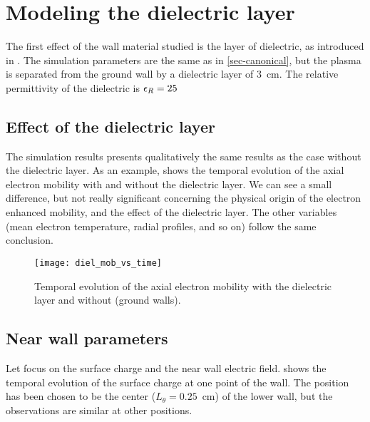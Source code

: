 
\section{Modeling the dielectric layer }
  \label{sec-diel_layer}
  
  The first effect of the wall material studied is the layer of dielectric, as introduced in .
  The simulation parameters are the same as in \cref{sec-canonical}, but the plasma is separated from the ground wall by a dielectric layer of 3~cm.
  The relative permittivity of the dielectric is $\epsilon_{R}=25$
  
  
  \subsection{Effect of the dielectric layer} \label{subsec-effect_mob}
  
  The simulation results presents qualitatively the same results as the case without the dielectric layer.
  As an example,  shows the temporal evolution of the axial electron mobility with and without the dielectric layer.
  We can see a small difference, but not really significant concerning the physical origin of the electron enhanced mobility, and the effect of the dielectric layer.
  The other variables (mean electron temperature, radial profiles, and so on) follow the same conclusion.
  
  \begin{figure}[hbtp]
    \centering
    \texttt{[image: diel\_mob\_vs\_time]}
    \caption{Temporal evolution of the axial electron mobility with the dielectric layer and without (ground walls).}
    \label{fig-mod_diel_comp}
  \end{figure}
  
  \subsection{Near wall parameters} \label{subsec-nearwall}
    Let focus on the surface charge and the near wall electric field.
     shows the temporal evolution of the surface charge at one point of the wall.
    The position has been chosen to be the center ($L_{\theta} = 0.25$~cm) of the lower wall, but the observations are similar at other positions.
     
